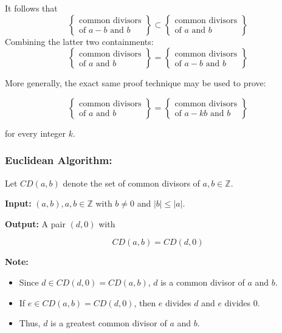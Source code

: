 \documentclass[11pt, draft]{article}
\begin{document}
It follows that
\[
    \left\{
    \begin{array}{l}
        \text{common divisors} \\
        \text{of } a - b \text{ and } b
    \end{array}
    \right\}
    \subset
    \left\{
    \begin{array}{l}
        \text{common divisors} \\
        \text{of } a \text{ and } b
    \end{array}
    \right\}
\]
Combining the latter two containments:
\[
    \left\{
    \begin{array}{l}
        \text{common divisors} \\
        \text{of } a \text{ and } b
    \end{array}
    \right\}
    =
    \left\{
    \begin{array}{l}
        \text{common divisors} \\
        \text{of } a - b \text{ and } b
    \end{array}
    \right\}
\]

More generally, the exact same proof technique may be used to prove:

\[
    \left\{
    \begin{array}{l}
        \text{common divisors} \\
        \text{of } a \text{ and } b
    \end{array}
    \right\}
    =
    \left\{
    \begin{array}{l}
        \text{common divisors} \\
        \text{of } a - kb \text{ and } b
    \end{array}
    \right\}
\]

for every integer $k$.

\subsubsection{Euclidean Algorithm:}

Let $CD(a, b)$ denote the set of common divisors of $a, b \in \mathbb{Z}$.

\textbf{Input:} $(a, b), a, b \in \mathbb{Z}$ with $b \neq 0$ and $|b| \leq |a|$.

\textbf{Output:} A pair $(d, 0)$ with

\[
    CD(a, b) = CD(d, 0)
\]

\textbf{Note:}
\begin{itemize}
    \item Since $d \in CD(d, 0) = CD(a, b)$, $d$ is a common divisor of $a$ and $b$.
    \item If $e \in CD(a, b) = CD(d, 0)$, then $e$ divides $d$ and $e$ divides $0$.
    \item Thus, $d$ is a greatest common divisor of $a$ and $b$.
\end{itemize}
\end{document}
